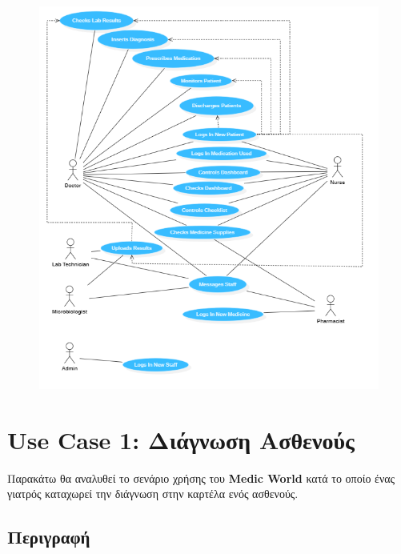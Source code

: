 \documentclass{article}
\begin{document}
\newpage
\begin{figure}[!htb]
        \centering
        \includegraphics[width=1.0\textwidth]{UML.png}
        \end{figure}
        
        \vspace{0.5cm}

\section{Use Case 1: Διάγνωση Ασθενούς}

Παρακάτω θα αναλυθεί το σενάριο χρήσης του \textbf{Medic World} κατά το οποίο ένας γιατρός καταχωρεί την διάγνωση στην καρτέλα ενός ασθενούς.

\subsection{Περιγραφή}
\end{document}
